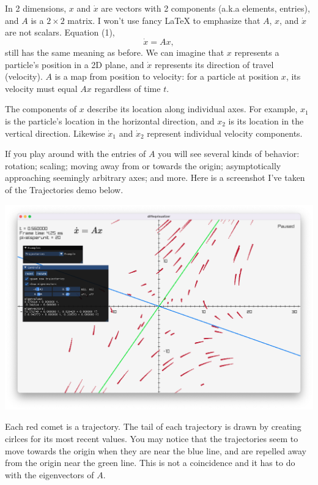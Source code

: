 \documentclass[11pt, oneside]{article}   	%
\begin{document}
In 2 dimensions, $x$ and $\dot{x}$ are vectors with 2 components (a.k.a elements, entries), and $A$ is a $2\times 2$ matrix.
I won't use fancy LaTeX to emphasize that $A$, $x$, and $\dot{x}$ are not scalars.
Equation (1),
$$ \dot{x} = Ax ,$$
still has the same meaning as before.
We can imagine that $x$ represents a particle's position in a 2D plane,
and $\dot{x}$ represents its direction of travel (velocity).
$A$ is a map from position to velocity: for a particle at position $x$, its velocity must equal $Ax$ regardless of time $t$.

The components of $x$ describe its location along individual axes.
For example, $x_1$ is the particle's location in the horizontal direction,
and $x_2$ is its location in the vertical direction.
Likewise $\dot{x}_1$ and $\dot{x}_2$ represent individual velocity components.

If you play around with the entries of $A$ you will see several kinds of behavior:
rotation;
scaling;
moving away from or towards the origin;
asymptotically approaching seemingly arbitrary axes;
and more.
Here is a screenshot I've taken of the Trajectories demo below.

\graphicspath{ {./assets/} }
\includegraphics[scale=0.3]{screenshot_trajectories}

Each red comet is a trajectory.
The tail of each trajectory is drawn by creating cirlces for its most recent values.
You may notice that the trajectories seem to move towards the origin when they are near the blue line,
and are repelled away from the origin near the green line.
This is not a coincidence and it has to do with the eigenvectors of $A$.
\end{document}
